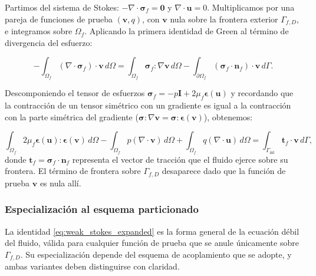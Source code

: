 \documentclass[12pt, letterpaper]{report}
\theoremstyle{definition}
\begin{document}
Partimos del sistema de Stokes: $-\nabla \cdot \boldsymbol{\sigma}_f = \mathbf{0}$ y $\nabla \cdot \mathbf{u} = 0$. Multiplicamos por una pareja de funciones de prueba $(\mathbf{v}, q)$, con $\mathbf{v}$ nula sobre la frontera exterior $\Gamma_{f,D}$, e integramos sobre $\Omega_f$. Aplicando la primera identidad de Green al término de divergencia del esfuerzo:

\[
-\int_{\Omega_f} (\nabla \cdot \boldsymbol{\sigma}_f) \cdot \mathbf{v} \, d\Omega = \int_{\Omega_f} \boldsymbol{\sigma}_f : \nabla \mathbf{v} \, d\Omega - \int_{\partial \Omega_f} (\boldsymbol{\sigma}_f \cdot \mathbf{n}_f) \cdot \mathbf{v} \, d\Gamma.
\]

Descomponiendo el tensor de esfuerzos $\boldsymbol{\sigma}_f = -p\mathbf{I} + 2\mu_f \boldsymbol{\epsilon}(\mathbf{u})$ y recordando que la contracción de un tensor simétrico con un gradiente es igual a la contracción con la parte simétrica del gradiente ($\boldsymbol{\sigma}:\nabla \mathbf{v} = \boldsymbol{\sigma}:\boldsymbol{\epsilon}(\mathbf{v})$), obtenemos:

\begin{equation} \label{eq:weak_stokes_expanded}
    \int_{\Omega_f} 2\mu_f \boldsymbol{\epsilon}(\mathbf{u}) : \boldsymbol{\epsilon}(\mathbf{v}) \, d\Omega - \int_{\Omega_f} p (\nabla \cdot \mathbf{v}) \, d\Omega + \int_{\Omega_f} q (\nabla \cdot \mathbf{u}) \, d\Omega = \int_{\Gamma_{\text{int}}} \mathbf{t}_f \cdot \mathbf{v} \, d\Gamma,
\end{equation}
donde $\mathbf{t}_f = \boldsymbol{\sigma}_f \cdot \mathbf{n}_f$ representa el vector de tracción que el fluido ejerce sobre su frontera. El término de frontera sobre $\Gamma_{f,D}$ desaparece dado que la función de prueba $\mathbf{v}$ es nula allí.

\subsubsection*{Especialización al esquema particionado}

La identidad \eqref{eq:weak_stokes_expanded} es la forma general de la ecuación débil del fluido, válida para cualquier función de prueba que se anule únicamente sobre $\Gamma_{f,D}$. Su especialización depende del esquema de acoplamiento que se adopte, y ambas variantes deben distinguirse con claridad.
\end{document}
